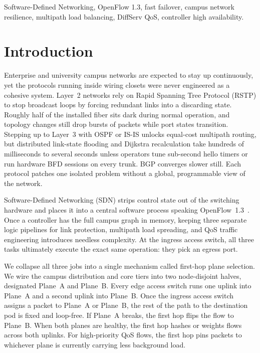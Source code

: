 \documentclass[conference]{IEEEtran}
\begin{document}
\begin{IEEEkeywords}
Software-Defined Networking, OpenFlow 1.3, fast failover, campus network resilience, multipath load balancing, DiffServ QoS, controller high availability.
\end{IEEEkeywords}

\section{Introduction}
Enterprise and university campus networks are expected to stay up continuously, yet the protocols running inside wiring closets were never engineered as a cohesive system. Layer~2 networks rely on Rapid Spanning Tree Protocol (RSTP) to stop broadcast loops by forcing redundant links into a discarding state. Roughly half of the installed fiber sits dark during normal operation, and topology changes still drop bursts of packets while port states transition. Stepping up to Layer~3 with OSPF or IS-IS unlocks equal-cost multipath routing, but distributed link-state flooding and Dijkstra recalculation take hundreds of milliseconds to several seconds unless operators tune sub-second hello timers or run hardware BFD sessions on every trunk. BGP converges slower still. Each protocol patches one isolated problem without a global, programmable view of the network.

Software-Defined Networking (SDN) strips control state out of the switching hardware and places it into a central software process speaking OpenFlow~1.3~\cite{openflow}. Once a controller has the full campus graph in memory, keeping three separate logic pipelines for link protection, multipath load spreading, and QoS traffic engineering introduces needless complexity. At the ingress access switch, all three tasks ultimately execute the exact same operation: they pick an egress port.

We collapse all three jobs into a single mechanism called first-hop plane selection. We wire the campus distribution and core tiers into two node-disjoint halves, designated Plane~A and Plane~B. Every edge access switch runs one uplink into Plane~A and a second uplink into Plane~B. Once the ingress access switch assigns a packet to Plane~A or Plane~B, the rest of the path to the destination pod is fixed and loop-free. If Plane~A breaks, the first hop flips the flow to Plane~B. When both planes are healthy, the first hop hashes or weights flows across both uplinks. For high-priority QoS flows, the first hop pins packets to whichever plane is currently carrying less background load.
\end{document}
